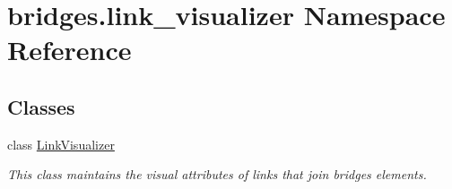 \hypertarget{namespacebridges_1_1link__visualizer}{}\section{bridges.\+link\+\_\+visualizer Namespace Reference}
\label{namespacebridges_1_1link__visualizer}
\subsection*{Classes}
\begin{DoxyCompactItemize}
\item 
class \hyperlink{classbridges_1_1link__visualizer_1_1_link_visualizer}{Link\+Visualizer}
\begin{DoxyCompactList}\small\item\em This class maintains the visual attributes of links that join bridges elements. \end{DoxyCompactList}\end{DoxyCompactItemize}
